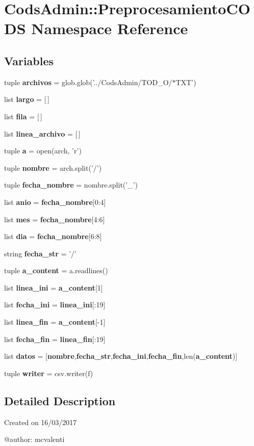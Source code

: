 \section{\-Cods\-Admin\-:\-:\-Preprocesamiento\-C\-O\-D\-S \-Namespace \-Reference}
\label{namespace_cods_admin_1_1_preprocesamiento_c_o_d_s}
\subsection*{\-Variables}
\begin{DoxyCompactItemize}
\item 
tuple {\bf archivos} = glob.\-glob('../\-Cods\-Admin/\-T\-O\-D\-\_\-\-O/$\ast$\-T\-X\-T')
\item 
list {\bf largo} = [$\,$]
\item 
list {\bf fila} = [$\,$]
\item 
list {\bf linea\-\_\-archivo} = [$\,$]
\item 
tuple {\bf a} = open(arch, 'r')
\item 
tuple {\bf nombre} = arch.\-split('/')
\item 
tuple {\bf fecha\-\_\-nombre} = nombre.\-split('\-\_\-')
\item 
list {\bf anio} = {\bf fecha\-\_\-nombre}[0\-:4]
\item 
list {\bf mes} = {\bf fecha\-\_\-nombre}[4\-:6]
\item 
list {\bf dia} = {\bf fecha\-\_\-nombre}[6\-:8]
\item 
string {\bf fecha\-\_\-str} = '/'
\item 
tuple {\bf a\-\_\-content} = a.\-readlines()
\item 
list {\bf linea\-\_\-ini} = {\bf a\-\_\-content}[1]
\item 
list {\bf fecha\-\_\-ini} = {\bf linea\-\_\-ini}[\-:19]
\item 
list {\bf linea\-\_\-fin} = {\bf a\-\_\-content}[-\/1]
\item 
list {\bf fecha\-\_\-fin} = {\bf linea\-\_\-fin}[\-:19]
\item 
list {\bf datos} = [{\bf nombre},{\bf fecha\-\_\-str},{\bf fecha\-\_\-ini},{\bf fecha\-\_\-fin},len({\bf a\-\_\-content})]
\item 
tuple {\bf writer} = csv.\-writer(f)
\end{DoxyCompactItemize}


\subsection{\-Detailed \-Description}
\begin{DoxyVerb}
Created on 16/03/2017

@author: mcvalenti
\end{DoxyVerb}
 

